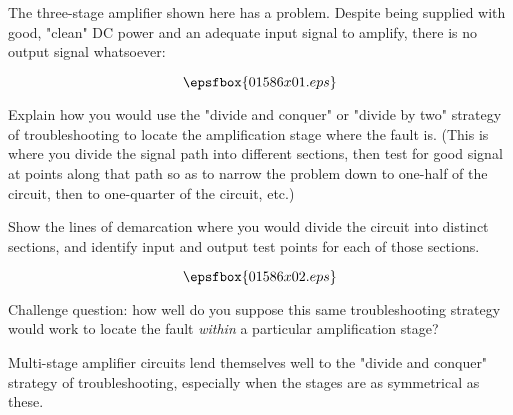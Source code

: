 

The three-stage amplifier shown here has a problem.  Despite being supplied with good, "clean" DC power and an adequate input signal to amplify, there is no output signal whatsoever:

$$\epsfbox{01586x01.eps}$$

Explain how you would use the "divide and conquer" or "divide by two" strategy of troubleshooting to locate the amplification stage where the fault is.  (This is where you divide the signal path into different sections, then test for good signal at points along that path so as to narrow the problem down to one-half of the circuit, then to one-quarter of the circuit, etc.)

Show the lines of demarcation where you would divide the circuit into distinct sections, and identify input and output test points for each of those sections.







$$\epsfbox{01586x02.eps}$$

\vskip 10pt

Challenge question: how well do you suppose this same troubleshooting strategy would work to locate the fault {\it within} a particular amplification stage?







Multi-stage amplifier circuits lend themselves well to the "divide and conquer" strategy of troubleshooting, especially when the stages are as symmetrical as these.




